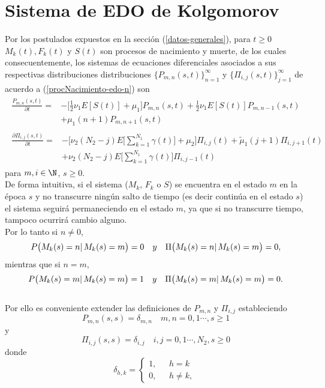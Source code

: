 \section{Sistema de EDO de Kolgomorov}
Por los postulados expuestos en la sección (\ref{datos-generales}), para $t\geq 0$  $M_k(t), F_k(t)$ y $S(t)$ son procesos de nacimiento y muerte, de los cuales consecuentemente, los sistemas de ecuaciones diferenciales asociados a sus respectivas distribuciones distribuciones $\{P_{m,n}(s,t)\}_{n=1}^\infty$ y $\{\Pi_{i,j}(s,t)\}_{j=1}^\infty$ de acuerdo a (\ref{procNacimiento-edo-n}) son
\begin{eqnarray}
    \begin{array}{cr}
        \frac{P_{m,n}(s,t)}{\partial t} = & -\bigg[\frac{1}{2}\nu_1E[S(t)]+\mu_1\bigg]P_{m,n}(s,t)+\frac{1}{2}\nu_1E[S(t)]P_{m,n-1}(s,t) \\
        & +\mu_1 (n+1)P_{m,n+1}(s,t)
    \end{array}
    \label{tesis-edo-p_n}
\end{eqnarray}
\begin{eqnarray}
    \begin{array}{cr}
     \frac{\partial\Pi_{i,j}(s,t)}{\partial t}= & -\bigg[\nu_2(N_2-j)E\big[\sum_{k=1}^{N_1}\gamma(t)\big]+\mu_2\bigg]\Pi_{i,j}(t)
     +\tilde{\mu}_1 (j+1)\Pi_{i,j+1}(t)
     \\&+\nu_2(N_2-j)E\big[\sum_{k=1}^{N_1}\gamma(t)\big]\Pi_{i,j-1}(t)
    \end{array}
\end{eqnarray}
para $m,i\in\N$, $s\geq 0$.\\
De forma intuitiva, si el sistema ($M_k$, $F_k$ o $S$) se encuentra en el estado $m$ en la época $s$ y no transcurre ningún salto de tiempo (es decir continúa en el estado $s$) el sistema seguirá permaneciendo en el estado $m$, ya que si no transcurre tiempo, tampoco ocurrirá cambio alguno.\\
Por lo tanto si $n\not=0$, $$P\big(M_k(s)=n |\thinspace M_k(s)=m\big)=0\quad y\quad \Pi\big(M_k(s)=n |\thinspace M_k(s)=m\big)=0,$$
mientras que si $n=m$, $$P\big(M_k(s)=m |\thinspace M_k(s)=m\big)=1\quad y \quad \Pi\big(M_k(s)=m |\thinspace M_k(s)=m\big)=0.$$\\
Por ello es conveniente extender las definiciones de $P_{m,n}$ y $\Pi_{i,j}$ estableciendo $$P_{m,n}(s,s)=\delta_{m,n}\quad m,n=0,1\cdots, s\geq 1$$
y
$$\Pi_{i,j}(s,s)=\delta_{i,j}\quad i,j=0,1\cdots,N_2, s\geq 0$$
donde 
$$\delta_{h,k}=
    \begin{cases}
    1, & \mbox{ $h=k$ } \\
    0, & \mbox{ $h\not=k$},
    \end{cases}$$
